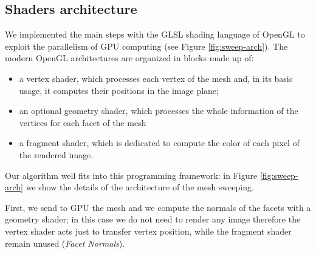 \subsection{Shaders architecture}
We implemented the main steps with the GLSL shading language of OpenGL \cite{opengl} to exploit the parallelism of GPU computing (see Figure \ref{fig:sweep-arch}). 
The modern OpenGL architectures are organized in blocks made up of:
\begin{itemize}
 \item a vertex shader, which processes each vertex of the mesh and, in its basic usage, it computes their positions in the image plane;
 \item an optional geometry shader, which processes the whole information of the vertices for each facet of the mesh
 \item a fragment shader, which is dedicated to compute the color of each pixel of the rendered image.
\end{itemize}
Our algorithm well fits into this programming framework: in Figure \ref{fig:sweep-arch} we show the details of the architecture of the mesh sweeping. 


First, we send to GPU the mesh and we compute the normals of the facets with a geometry shader; in this case we do not need to render any image therefore the vertex shader acts just to transfer vertex position, while the fragment shader remain unused (\emph{Facet Normals}).

